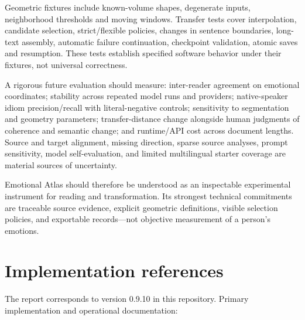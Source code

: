 \documentclass[manuscript,screen,nonacm]{acmart}
\begin{document}
Geometric fixtures include known-volume shapes, degenerate inputs,
neighborhood thresholds and moving windows. Transfer tests cover
interpolation, candidate selection, strict/flexible policies, changes in
sentence boundaries, long-text assembly, automatic failure continuation,
checkpoint validation, atomic saves and resumption. These tests
establish specified software behavior under their fixtures, not
universal correctness.

A rigorous future evaluation should measure: inter-reader agreement on
emotional coordinates; stability across repeated model runs and
providers; native-speaker idiom precision/recall with literal-negative
controls; sensitivity to segmentation and geometry parameters;
transfer-distance change alongside human judgments of coherence and
semantic change; and runtime/API cost across document lengths. Source
and target alignment, missing direction, sparse source analyses, prompt
sensitivity, model self-evaluation, and limited multilingual starter
coverage are material sources of uncertainty.

Emotional Atlas should therefore be understood as an inspectable
experimental instrument for reading and transformation. Its strongest
technical commitments are traceable source evidence, explicit geometric
definitions, visible selection policies, and exportable records---not
objective measurement of a person's emotions.

\section{Implementation references}\label{implementation-references}

The report corresponds to version 0.9.10 in this repository. Primary
implementation and operational documentation:
\end{document}
